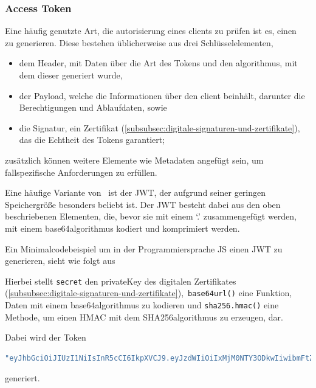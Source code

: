 \subsubsection[Access Token]{Access Token}\label{subsubsec:access-token}
Eine häufig genutzte Art, die \gls{autorisierung} eines \glspl{client} zu prüfen ist es, einen\  zu generieren.
Diese bestehen üblicherweise aus drei Schlüsselelementen,
\begin{itemize}
    \item dem Header, mit Daten über die Art des Tokens und den \gls{algorithmus}, mit dem dieser generiert wurde,
    \item der Payload, welche die Informationen über den \gls{client} beinhält, darunter \ua die Berechtigungen und Ablaufdaten, sowie
    \item die Signatur, ein Zertifikat (\autoref{subsubsec:digitale-signaturen-und-zertifikate}), das die Echtheit des Tokens garantiert;
\end{itemize}\label{itm:TokenElemente}
zusätzlich können weitere Elemente wie \zb Metadaten angefügt sein, um fallspezifische Anforderungen zu erfüllen.\autocite[\vglf][]{AccessTo39:online}

Eine häufige Variante von\  ist der \ac{JWT}, der aufgrund seiner geringen Speichergröße besonders beliebt ist.\autocite[\vglf][]{rfc7519} Der \ac{JWT} besteht dabei aus den oben beschriebenen Elementen, die, bevor sie mit einem `.' zusammengefügt werden, mit einem \gls{base64}\nonbreakdash \gls{algorithmus} kodiert und komprimiert werden.\autocite[\vglf][]{rfc7519}

Ein Minimalcodebeispiel um in der Programmiersprache \ac{JS} einen \ac{JWT} zu generieren, sieht wie folgt aus



Hierbei stellt \lstinline!secret! den \gls{privateKey}\autocite{rfc2104} des digitalen Zertifikates (\autoref{subsubsec:digitale-signaturen-und-zertifikate}),\ \lstinline!base64url()! eine Funktion, Daten mit einem \gls{base64}\nonbreakdash \gls{algorithmus} zu kodieren und \lstinline!sha256.hmac()! eine Methode, um einen \ac{HMAC} mit dem \gls{SHA256}\nonbreakdash\gls{algorithmus} zu erzeugen, dar.

Dabei wird der Token
\begin{lstlisting}[language = JavaScript,label={lst:jwt}]
"eyJhbGciOiJIUzI1NiIsInR5cCI6IkpXVCJ9.eyJzdWIiOiIxMjM0NTY3ODkwIiwibmFtZSI6IkpvaG4gRG9lIiwiaWF0IjoxNTE2MjM5MDIyfQ.SflKxwRJSMeKKF2QT4fwpMeJf36POk6yJV_adQssw5c"
\end{lstlisting}
generiert.

